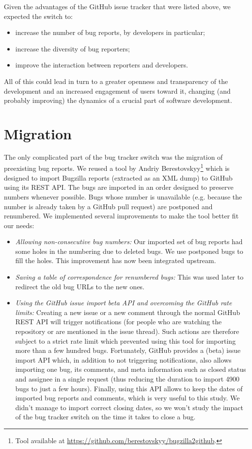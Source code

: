 \documentclass[runningheads]{llncs}
\begin{document}
Given the advantages of the GitHub issue tracker that were listed above, we expected the switch to:
\begin{itemize}
\item increase the number of bug reports, by developers in particular;
\item increase the diversity of bug reporters;
\item improve the interaction between reporters and developers.
\end{itemize}

All of this could lead in turn to a greater openness and transparency of the development and an increased engagement of users toward it, changing (and probably improving) the dynamics of a crucial part of software development. 

\section{Migration}
\label{migration}

The only complicated part of the bug tracker switch was the migration of preexisting bug reports. We reused a tool by Andriy Berestovskyy\footnote{Tool available at \url{https://github.com/berestovskyy/bugzilla2github}.} which is designed to import Bugzilla reports (extracted as an XML dump) to GitHub using its REST API. The bugs are imported in an order designed to preserve numbers whenever possible. Bugs whose number is unavailable (e.g. because the number is already taken by a GitHub pull request) are postponed and renumbered. We implemented several improvements to make the tool better fit our needs:
\begin{itemize}
\item \textit{Allowing non-consecutive bug numbers:} Our imported set of bug reports had some holes in the numbering due to deleted bugs. We use postponed bugs to fill the holes. This improvement has now been integrated upstream.
\item \textit{Saving a table of correspondence for renumbered bugs:} This was used later to redirect the old bug URLs to the new ones.
\item \textit{Using the GitHub issue import beta API and overcoming the GitHub rate limits:} Creating a new issue or a new comment through the normal GitHub REST API will trigger notifications (for people who are watching the repository or are mentioned in the issue thread). Such actions are therefore subject to a strict rate limit which prevented using this tool for importing more than a few hundred bugs. Fortunately, GitHub provides a (beta) issue import API which, in addition to not triggering notifications, also allows importing one bug, its comments, and meta information such as closed status and assignee in a single request (thus reducing the duration to import 4900 bugs to just a few hours). Finally, using this API allows to keep the dates of imported bug reports and comments, which is very useful to this study. We didn't manage to import correct closing dates, so we won't study the impact of the bug tracker switch on the time it takes to close a bug.
\end{itemize}
\end{document}
